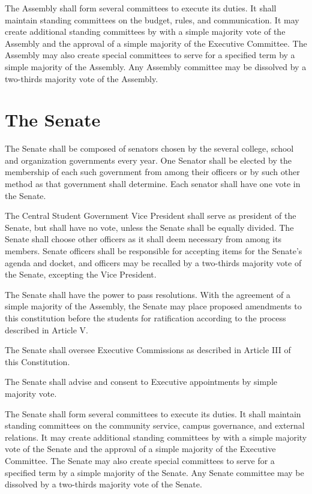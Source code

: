     The Assembly shall form several committees to execute its duties. It shall maintain standing committees on the budget, rules, and communication. It may create additional standing committees by with a simple majority vote of the Assembly and the approval of a simple majority of the Executive Committee. The Assembly may also create special committees to serve for a specified term by a simple majority of the Assembly. Any Assembly committee may be dissolved by a two-thirds majority vote of the Assembly.

\section{The Senate}
    The Senate shall be composed of senators chosen by the several college, school and organization governments every year. One Senator shall be elected by the membership of each such government from among their officers or by such other method as that government shall determine. Each senator shall have one vote in the Senate.

    The Central Student Government Vice President shall serve as president of the Senate, but shall have no vote, unless the Senate shall be equally divided. The Senate shall choose other officers as it shall deem necessary from among its members. Senate officers shall be responsible for accepting items for the Senate's agenda and docket, and officers may be recalled by a two-thirds majority vote of the Senate, excepting the Vice President.

    The Senate shall have the power to pass resolutions. With the agreement of a simple majority of the Assembly, the Senate may place proposed amendments to this constitution before the students for ratification according to the process described in Article V.

    The Senate shall oversee Executive Commissions as described in Article III of this Constitution.

    The Senate shall advise and consent to Executive appointments by simple majority vote.

    The Senate shall form several committees to execute its duties. It shall maintain standing committees on the community service, campus governance, and external relations. It may create additional standing committees by with a simple majority vote of the Senate and the approval of a simple majority of the Executive Committee. The Senate may also create special committees to serve for a specified term by a simple majority of the Senate. Any Senate committee may be dissolved by a two-thirds majority vote of the Senate.

